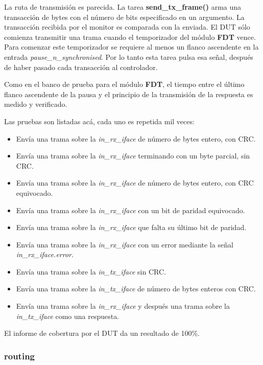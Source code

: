 \documentclass[a4paper, twoside, 11pt]{report}
\begin{document}
La ruta de transmisión es parecida. La tarea \textbf{send\_tx\_frame()} arma una transacción de bytes con el número de bits especificado en un argumento. La transacción recibida por el monitor es comparada con la enviada. El DUT sólo comienza transmitir una trama cuando el temporizador del módulo \textbf{FDT} vence. Para comenzar este temporizador se requiere al menos un flanco ascendente en la entrada \textit{pause\_n\_synchronised}. Por lo tanto esta tarea pulsa esa señal, después de haber pasado cada transacción al controlador.

Como en el banco de prueba para el módulo \textbf{FDT}, el tiempo entre el último flanco ascendente de la pausa y el principio de la transmisión de la respuesta es medido y verificado.

Las pruebas son listadas acá, cada uno es repetida mil veces:

\begin{itemize}
  \item Envía una trama sobre la \textit{in\_rx\_iface} de número de bytes entero, con CRC.
  \item Envía una trama sobre la \textit{in\_rx\_iface} terminando con un byte parcial, sin CRC.
  \item Envía una trama sobre la \textit{in\_rx\_iface} de número de bytes entero, con CRC equivocado.
  \item Envía una trama sobre la \textit{in\_rx\_iface} con un bit de paridad equivocado.
  \item Envía una trama sobre la \textit{in\_rx\_iface} que falta su último bit de paridad.
  \item Envía una trama sobre la \textit{in\_rx\_iface} con un error mediante la señal \textit{in\_rx\_iface.error}.
  \item Envía una trama sobre la \textit{in\_tx\_iface} sin CRC.
  \item Envía una trama sobre la \textit{in\_tx\_iface} de número de bytes enteros con CRC.
  \item Envía una trama sobre la \textit{in\_rx\_iface} y después una trama sobre la \textit{in\_tx\_iface} como una respuesta.
\end{itemize}

El informe de cobertura por el DUT da un resultado de 100\%.

\FloatBarrier
\subsubsection{routing}
\end{document}
